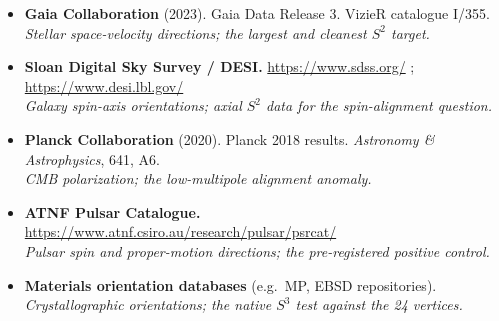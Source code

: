 \documentclass[11pt, letterpaper, openany]{book}
\begin{document}
\begin{itemize}
    \item \textbf{Gaia Collaboration} (2023). Gaia Data Release 3. VizieR catalogue I/355.
          \\ \textit{Stellar space-velocity directions; the largest and cleanest $S^2$ target.}
    \item \textbf{Sloan Digital Sky Survey / DESI.} \url{https://www.sdss.org/} ; \url{https://www.desi.lbl.gov/}
          \\ \textit{Galaxy spin-axis orientations; axial $S^2$ data for the spin-alignment question.}
    \item \textbf{Planck Collaboration} (2020). Planck 2018 results.
          \textit{Astronomy \& Astrophysics}, 641, A6.
          \\ \textit{CMB polarization; the low-multipole alignment anomaly.}
    \item \textbf{ATNF Pulsar Catalogue.} \url{https://www.atnf.csiro.au/research/pulsar/psrcat/}
          \\ \textit{Pulsar spin and proper-motion directions; the pre-registered positive control.}
    \item \textbf{Materials orientation databases} (e.g.\ MP, EBSD repositories).
          \\ \textit{Crystallographic orientations; the native $S^3$ test against the 24 vertices.}
\end{itemize}
\end{document}
